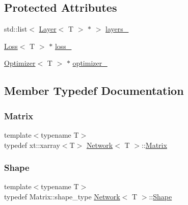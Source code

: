 \subsection*{Protected Attributes}
\begin{DoxyCompactItemize}
\item 
std\+::list$<$ \mbox{\hyperlink{class_layer}{Layer}}$<$ T $>$ $\ast$ $>$ \mbox{\hyperlink{class_network_a44ed9431544add6652254104c3413d4c}{layers\+\_\+}}
\item 
\mbox{\hyperlink{class_loss}{Loss}}$<$ T $>$ $\ast$ \mbox{\hyperlink{class_network_a1445c84bc4a3f14a71e982c1c2bef76d}{loss\+\_\+}}
\item 
\mbox{\hyperlink{class_optimizer}{Optimizer}}$<$ T $>$ $\ast$ \mbox{\hyperlink{class_network_a41e9d6851a95074ffec5e66b78deb9b7}{optimizer\+\_\+}}
\end{DoxyCompactItemize}


\subsection{Member Typedef Documentation}
\mbox{\label{class_network_a3217727df6a4bde68fb686293258d7f6}} 
\subsubsection{\texorpdfstring{Matrix}{Matrix}}
{\footnotesize\ttfamily template$<$typename T$>$ \\
typedef xt\+::xarray$<$T$>$ \mbox{\hyperlink{class_network}{Network}}$<$ T $>$\+::\mbox{\hyperlink{class_network_a3217727df6a4bde68fb686293258d7f6}{Matrix}}}

\mbox{\label{class_network_a581bef0355faccb9e6a4d4325792ec25}} 
\subsubsection{\texorpdfstring{Shape}{Shape}}
{\footnotesize\ttfamily template$<$typename T$>$ \\
typedef Matrix\+::shape\+\_\+type \mbox{\hyperlink{class_network}{Network}}$<$ T $>$\+::\mbox{\hyperlink{class_network_a581bef0355faccb9e6a4d4325792ec25}{Shape}}}



